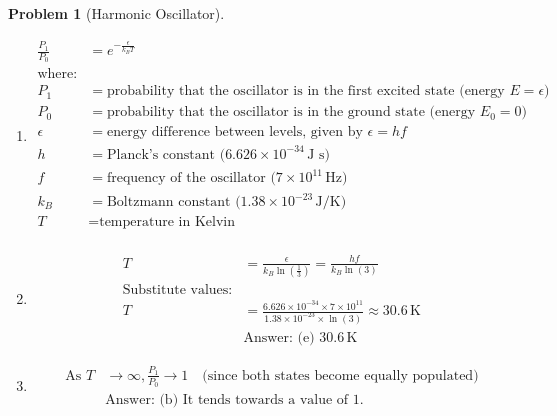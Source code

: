 \documentclass[12pt]{article}
\theoremstyle{definition} %
\newtheorem{problem}{Problem}
\theoremstyle{plain} %
\begin{document}
\begin{problem}[Harmonic Oscillator]
    \noindent
    \begin{enumerate}
        \item \begin{align*}
        \frac{P_1}{P_0} &= e^{-\frac{\epsilon}{k_B T}} \\
        \text{where:} \\
        P_1 &= \text{probability that the oscillator is in the first excited state (energy } E = \epsilon) \\
        P_0 &= \text{probability that the oscillator is in the ground state (energy } E_0 = 0) \\
        \epsilon &= \text{energy difference between levels, given by } \epsilon = h f \\
        h &= \text{Planck's constant (} 6.626 \times 10^{-34} \, \text{J s)} \\
        f &= \text{frequency of the oscillator (} 7 \times 10^{11} \, \text{Hz)} \\
        k_B &= \text{Boltzmann constant (} 1.38 \times 10^{-23} \, \text{J/K)} \\
        T &= \text{temperature in Kelvin} \\
        \end{align*}
        \item \begin{align*}
        T &= \frac{\epsilon}{k_B \ln \left( \frac{1}{3} \right)} = \frac{h f}{k_B \ln(3)} \\
        \text{Substitute values:} \\
        T &= \frac{6.626 \times 10^{-34} \times 7 \times 10^{11}}{1.38 \times 10^{-23} \times \ln(3)} \approx 30.6 \, \text{K} \\
        &\text{Answer: (e) } 30.6 \, \text{K}
        \end{align*}
        \item \begin{align*}
        \text{As } T &\to \infty, \frac{P_1}{P_0} \to 1 \quad \text{(since both states become equally populated)} \\
        &\text{Answer: (b) It tends towards a value of 1.}
        \end{align*}
    \end{enumerate}
\end{problem}
\end{document}
